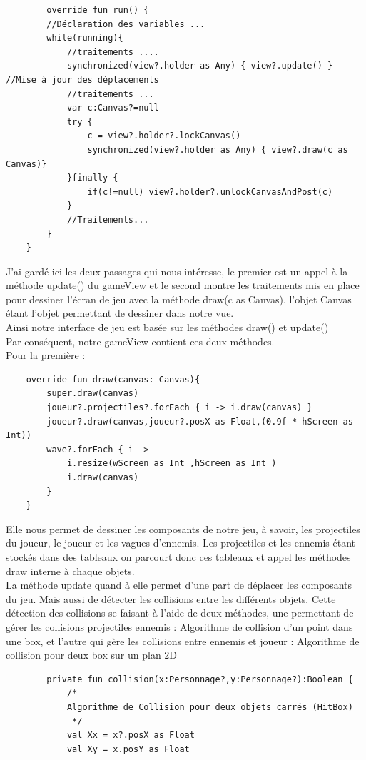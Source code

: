 \documentclass{article}
\begin{document}
\begin{itemize}
    \begin{verbatim}
        override fun run() {
        //Déclaration des variables ...
        while(running){
            //traitements ....
            synchronized(view?.holder as Any) { view?.update() } //Mise à jour des déplacements
            //traitements ...
            var c:Canvas?=null
            try {
                c = view?.holder?.lockCanvas()
                synchronized(view?.holder as Any) { view?.draw(c as Canvas)}
            }finally {
                if(c!=null) view?.holder?.unlockCanvasAndPost(c)
            }
            //Traitements...
        }
    }
    \end{verbatim}
    J'ai gardé ici les deux passages qui nous intéresse, le premier est un appel à la méthode update() du gameView et le second montre les traitements mis en place pour dessiner l'écran de jeu avec la méthode draw(c as Canvas), l'objet Canvas étant l'objet permettant de dessiner dans notre vue.\\ 
    Ainsi notre interface de jeu est basée sur les méthodes draw() et update()\\
    
    Par conséquent, notre gameView contient ces deux méthodes.\\ 
    Pour la première : 
    \begin{verbatim}
    override fun draw(canvas: Canvas){
        super.draw(canvas)
        joueur?.projectiles?.forEach { i -> i.draw(canvas) }
        joueur?.draw(canvas,joueur?.posX as Float,(0.9f * hScreen as Int))
        wave?.forEach { i ->
            i.resize(wScreen as Int ,hScreen as Int )
            i.draw(canvas)
        }
    }
    \end{verbatim}
    Elle nous permet de dessiner les composants de notre jeu, à savoir, les projectiles du joueur, le joueur et les vagues d'ennemis. Les projectiles et les ennemis étant stockés dans des tableaux on parcourt donc ces tableaux et appel les méthodes draw interne à chaque objets. \\ 
    La méthode update quand à elle permet d'une part de déplacer les composants du jeu. Mais aussi de détecter les collisions entre les différents objets. Cette détection des collisions se faisant à l'aide de deux méthodes, une permettant de gérer les collisions projectiles ennemis : Algorithme de collision d'un point dans une box, et l'autre qui gère les collisions entre ennemis et joueur : Algorithme de collision pour deux box sur un plan 2D 
    \begin{verbatim}
        private fun collision(x:Personnage?,y:Personnage?):Boolean {
            /*
            Algorithme de Collision pour deux objets carrés (HitBox)
             */
            val Xx = x?.posX as Float
            val Xy = x.posY as Float


\end{verbatim}
\end{itemize}
\end{document}
